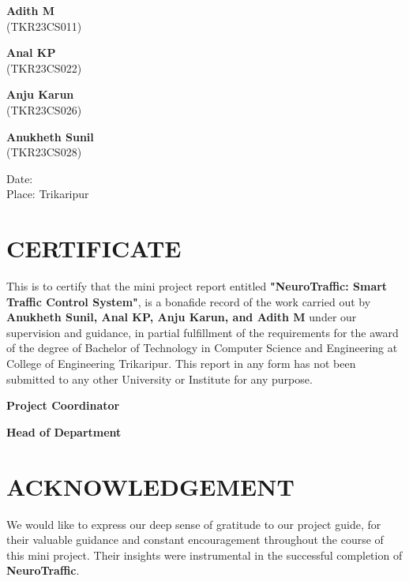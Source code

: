 \documentclass[12pt,a4paper]{report}
\begin{document}
\vspace{1.5cm}
\noindent
\begin{minipage}[t]{0.45\textwidth}
    \textbf{Adith M} \\ (TKR23CS011) 
\end{minipage}
\hfill
\begin{minipage}[t]{0.45\textwidth}
    \textbf{Anal KP} \\ (TKR23CS022)
\end{minipage}

\vspace{1cm}
\noindent
\begin{minipage}[t]{0.45\textwidth}
    \textbf{Anju Karun} \\ (TKR23CS026)
\end{minipage}
\hfill
\begin{minipage}[t]{0.45\textwidth}
    \textbf{Anukheth Sunil} \\ (TKR23CS028)
\end{minipage}

\vspace{1cm}
\noindent
Date:  \\
Place: Trikaripur

\chapter*{CERTIFICATE}
This is to certify that the mini project report entitled \textbf{"NeuroTraffic: Smart Traffic Control System"}, is a bonafide record of the work carried out by \textbf{Anukheth Sunil, Anal KP, Anju Karun, and Adith M} under our supervision and guidance, in partial fulfillment of the requirements for the award of the degree of Bachelor of Technology in Computer Science and Engineering at College of Engineering Trikaripur. This report in any form has not
been submitted to any other University or Institute for any purpose.

\vspace{3.5cm}
\noindent
\begin{minipage}[t]{0.45\textwidth}
    \textbf{Project Coordinator}
\end{minipage}
\hfill
\begin{minipage}[t]{0.45\textwidth}
    \textbf{Head of Department}
\end{minipage}

\chapter*{ACKNOWLEDGEMENT}
We would like to express our deep sense of gratitude to our project guide, for their valuable guidance and constant encouragement throughout the course of this mini project. Their insights were instrumental in the successful completion of \textbf{NeuroTraffic}.
\end{document}
